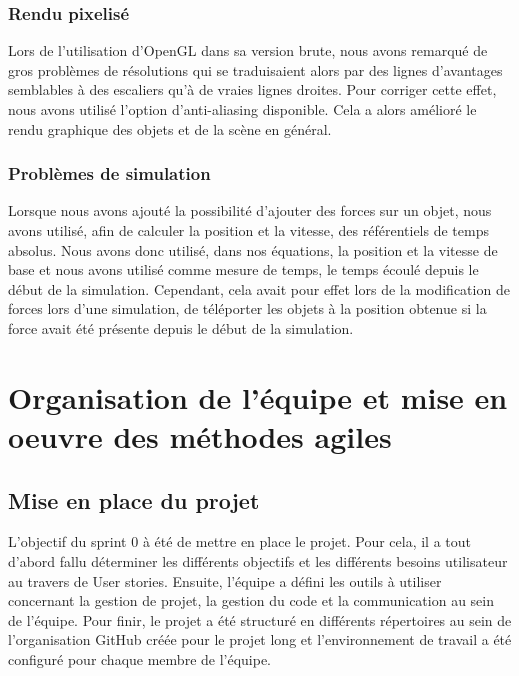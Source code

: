 \documentclass[11pt]{report}
\begin{document}
\newpage

\subsection{Rendu pixelisé}


Lors de l'utilisation d'OpenGL dans sa version brute, nous avons remarqué de gros problèmes de résolutions qui se traduisaient alors
par des lignes d'avantages semblables à des escaliers qu'à de vraies lignes droites. Pour corriger cette effet, nous avons utilisé l'option
d'anti-aliasing disponible. Cela a alors amélioré le rendu graphique des objets et de la scène en général.

\subsection{Problèmes de simulation}

Lorsque nous avons ajouté la possibilité d'ajouter des forces sur un objet, nous avons utilisé, afin de calculer la position et la vitesse, des
référentiels de temps absolus. Nous avons donc utilisé, dans nos équations, la position et la vitesse de base et nous avons utilisé comme mesure
de temps, le temps écoulé depuis le début de la simulation. Cependant, cela avait pour effet lors de la modification de forces lors d'une
simulation, de téléporter les objets à la position obtenue si la force avait été présente depuis le début de la simulation.

\chapter{Organisation de l'équipe et mise en oeuvre des méthodes agiles}

\section{Mise en place du projet}
L'objectif du sprint 0 à été de mettre en place le projet. Pour cela, il a tout d'abord fallu
déterminer les différents objectifs et les différents besoins utilisateur au travers de User stories. Ensuite, l'équipe a défini
les outils à utiliser concernant la gestion de projet, la gestion du code et la communication au sein de l'équipe.
Pour finir, le projet a été structuré en différents répertoires au sein de l'organisation GitHub créée pour le projet long
et l'environnement de travail a été configuré pour chaque membre de l'équipe.\newline
\end{document}
